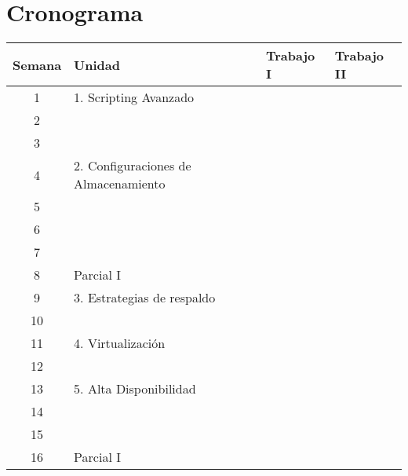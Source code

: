 

\section {Cronograma}
\begin{tabular}{c|l|l|l}
Semana & Unidad & Trabajo I & Trabajo II\\
\hline
\hline
1	& 	1. Scripting Avanzado &  &  \\
2 	& 								 	& \\
3	& 									&\\
\hline
\hline
4	& 	2. Configuraciones de Almacenamiento &  &  \\
5 	& 									&\\
6	& 									&\\
7	& 									& \\
\hline
\hline
8	& 	Parcial I			&  &  \\
\hline
\hline
9 	& 	3. Estrategias de respaldo	&  \\
10	& 								& \\ 
\hline
\hline
11	& 	4. Virtualización			&& \\ 
12	& 								&\\
\hline
\hline
13	& 	5. Alta Disponibilidad		&& \\
14	& 								&\\
15	& 								&& \\ 
\hline
\hline
16	& 	Parcial I					& &  \\
\hline
\hline
\end{tabular}




